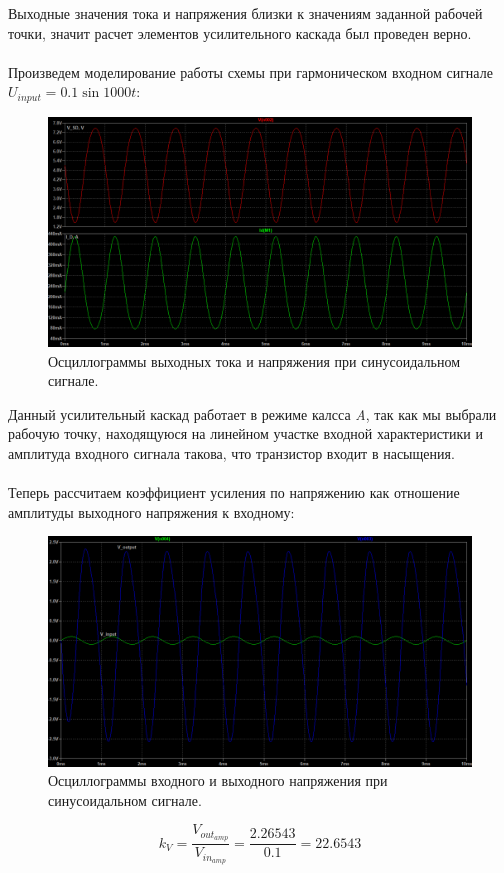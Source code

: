 \documentclass[12pt]{article}
\begin{document}
Выходные значения тока и напряжения близки к значениям заданной рабочей точки, значит расчет элементов усилительного каскада был проведен верно. \\
\ \\
Произведем моделирование работы схемы при гармоническом входном сигнале $U_{input} = 0.1 \sin{1000 t}$:
\begin{figure}[H]
    \centering
    \includegraphics[width=\textwidth]{3_sin_signal.png}
    \caption{Осциллограммы выходных тока и напряжения при синусоидальном сигнале.}
    \label{fig:3_sin_signal}
\end{figure}

Данный усилительный каскад работает в режиме калсса \emph{A}, так как мы выбрали рабочую точку, находящуюся на линейном участке входной характеристики и амплитуда входного сигнала такова, что транзистор входит в насыщения. \\
\ \\
Теперь рассчитаем коэффициент усиления по напряжению как отношение амплитуды выходного напряжения к входному:
\begin{figure}[H]
    \centering
    \includegraphics[width=\textwidth]{3_v_in_out.png}
    \caption{Осциллограммы входного и выходного напряжения при синусоидальном сигнале.}
    \label{fig:3_v_in_out}
\end{figure}
\[
    k_V = \frac{V_{out_{amp}}}{V_{in_{amp}}} = \frac{2.26543}{0.1} = 22.6543
\]
\end{document}
